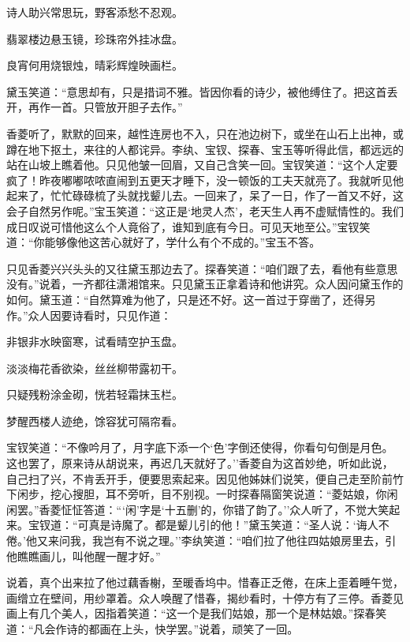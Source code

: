 诗人助兴常思玩，野客添愁不忍观。

翡翠楼边悬玉镜，珍珠帘外挂冰盘。

良宵何用烧银烛，晴彩辉煌映画栏。

黛玉笑道：``意思却有，只是措词不雅。皆因你看的诗少，被他缚住了。把这首丢开，再作一首。只管放开胆子去作。''

香菱听了，默默的回来，越性连房也不入，只在池边树下，或坐在山石上出神，或蹲在地下抠土，来往的人都诧异。李纨、宝钗、探春、宝玉等听得此信，都远远的站在山坡上瞧着他。只见他皱一回眉，又自己含笑一回。宝钗笑道：``这个人定要疯了！昨夜嘟嘟哝哝直闹到五更天才睡下，没一顿饭的工夫天就亮了。我就听见他起来了，忙忙碌碌梳了头就找颦儿去。一回来了，呆了一日，作了一首又不好，这会子自然另作呢。''宝玉笑道：``这正是`地灵人杰'，老天生人再不虚赋情性的。我们成日叹说可惜他这么个人竟俗了，谁知到底有今日。可见天地至公。''宝钗笑道：``你能够像他这苦心就好了，学什么有个不成的。''宝玉不答。

只见香菱兴兴头头的又往黛玉那边去了。探春笑道：``咱们跟了去，看他有些意思没有。''说着，一齐都往潇湘馆来。只见黛玉正拿着诗和他讲究。众人因问黛玉作的如何。黛玉道：``自然算难为他了，只是还不好。这一首过于穿凿了，还得另作。''众人因要诗看时，只见作道：

非银非水映窗寒，试看晴空护玉盘。

淡淡梅花香欲染，丝丝柳带露初干。

只疑残粉涂金砌，恍若轻霜抹玉栏。

梦醒西楼人迹绝，馀容犹可隔帘看。

宝钗笑道：``不像吟月了，月字底下添一个`色'字倒还使得，你看句句倒是月色。这也罢了，原来诗从胡说来，再迟几天就好了。''香菱自为这首妙绝，听如此说，自己扫了兴，不肯丢开手，便要思索起来。因见他姊妹们说笑，便自己走至阶前竹下闲步，挖心搜胆，耳不旁听，目不别视。一时探春隔窗笑说道：``菱姑娘，你闲闲罢。''香菱怔怔答道：```闲'字是`十五删'的，你错了韵了。''众人听了，不觉大笑起来。宝钗道：``可真是诗魔了。都是颦儿引的他！''黛玉笑道：``圣人说：`诲人不倦。'他又来问我，我岂有不说之理。''李纨笑道：``咱们拉了他往四姑娘房里去，引他瞧瞧画儿，叫他醒一醒才好。''

说着，真个出来拉了他过藕香榭，至暖香坞中。惜春正乏倦，在床上歪着睡午觉，画缯立在壁间，用纱罩着。众人唤醒了惜春，揭纱看时，十停方有了三停。香菱见画上有几个美人，因指着笑道：``这一个是我们姑娘，那一个是林姑娘。''探春笑道：``凡会作诗的都画在上头，快学罢。''说着，顽笑了一回。

